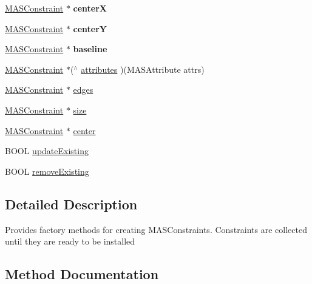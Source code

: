 \begin{DoxyCompactItemize}
\mbox{\label{interface_m_a_s_constraint_maker_ae2d5a4fee2886c77a58fab89871a8b98}} 
\mbox{\hyperlink{interface_m_a_s_constraint}{M\+A\+S\+Constraint}} $\ast$ {\bfseries centerX}
\item 
\mbox{\label{interface_m_a_s_constraint_maker_ab0e651513e115da5a635ce798a567e13}} 
\mbox{\hyperlink{interface_m_a_s_constraint}{M\+A\+S\+Constraint}} $\ast$ {\bfseries centerY}
\item 
\mbox{\label{interface_m_a_s_constraint_maker_ad012ed1b473b0ad41e20792967dd7198}} 
\mbox{\hyperlink{interface_m_a_s_constraint}{M\+A\+S\+Constraint}} $\ast$ {\bfseries baseline}
\item 
\mbox{\hyperlink{interface_m_a_s_constraint}{M\+A\+S\+Constraint}} $\ast$($^\wedge$ \mbox{\hyperlink{interface_m_a_s_constraint_maker_a06af1a154afe333292014c482b1dbf74}{attributes}} )(M\+A\+S\+Attribute attrs)
\item 
\mbox{\hyperlink{interface_m_a_s_constraint}{M\+A\+S\+Constraint}} $\ast$ \mbox{\hyperlink{interface_m_a_s_constraint_maker_a9344b85f1d75d2261bfcedc3b716024c}{edges}}
\item 
\mbox{\hyperlink{interface_m_a_s_constraint}{M\+A\+S\+Constraint}} $\ast$ \mbox{\hyperlink{interface_m_a_s_constraint_maker_a0ef127bf03a502b0e79b2ace44e4adac}{size}}
\item 
\mbox{\hyperlink{interface_m_a_s_constraint}{M\+A\+S\+Constraint}} $\ast$ \mbox{\hyperlink{interface_m_a_s_constraint_maker_ae101ae0527817e71bef0b9da59fcb317}{center}}
\item 
B\+O\+OL \mbox{\hyperlink{interface_m_a_s_constraint_maker_ae2b84a526dbef016eb4cecccf7efe98d}{update\+Existing}}
\item 
B\+O\+OL \mbox{\hyperlink{interface_m_a_s_constraint_maker_a04e1b295327d024abdc49fe5ae011dab}{remove\+Existing}}
\end{DoxyCompactItemize}


\subsection{Detailed Description}
Provides factory methods for creating M\+A\+S\+Constraints. Constraints are collected until they are ready to be installed 

\subsection{Method Documentation}
\mbox{\label{interface_m_a_s_constraint_maker_ad5302364de8afc6fa8467fcebd9a51e2}} 
